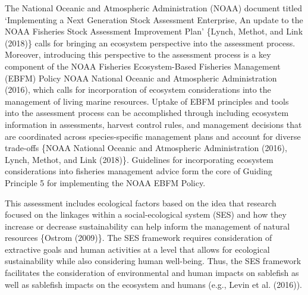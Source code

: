 \documentclass[11pt,
  english,
  a4paper,
]{article}
\begin{document}
\leavevmode\tagmcend\tagstructend


The National Oceanic and Atmospheric Administration (NOAA) document titled `Implementing a Next Generation Stock Assessment Enterprise, An update to the NOAA Fisheries Stock Assessment Improvement Plan' \{{Lynch, Methot, and Link (2018)\leavevmode\tagmcend\tagstructend}\} calls for bringing an ecosystem perspective into the assessment process. Moreover, introducing this perspective to the assessment process is a key component of the NOAA Fisheries Ecosystem-Based Fisheries Management (EBFM) Policy {NOAA National Oceanic and Atmospheric Administration (2016)\leavevmode\tagmcend\tagstructend}, which calls for incorporation of ecosystem considerations into the management of living marine resources. Uptake of EBFM principles and tools into the assessment process can be accomplished through including ecosystem information in assessments, harvest control rules, and management decisions that are coordinated across species-specific management plans and account for diverse trade-offs \{{NOAA National Oceanic and Atmospheric Administration (2016)\leavevmode\tagmcend\tagstructend}, {Lynch, Methot, and Link (2018)\leavevmode\tagmcend\tagstructend}\}. Guidelines for incorporating ecosystem considerations into fisheries management advice form the core of Guiding Principle 5 for implementing the NOAA EBFM Policy.

\leavevmode\tagmcend\tagstructend\par


This assessment includes ecological factors based on the idea that research focused on the linkages within a social-ecological system (SES) and how they increase or decrease sustainability can help inform the management of natural resources \{{Ostrom (2009)\leavevmode\tagmcend\tagstructend}\}. The SES framework requires consideration of extractive goals and human activities at a level that allows for ecological sustainability while also considering human well-being. Thus, the SES framework facilitates the consideration of environmental and human impacts on sablefish as well as sablefish impacts on the ecosystem and humans (e.g., {Levin et al. (2016)\leavevmode\tagmcend\tagstructend}).
\end{document}
